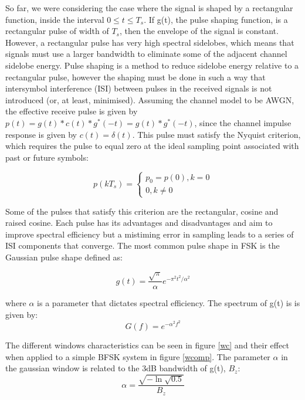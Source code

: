 \documentclass[12pt,a4paper,openright]{article}
\begin{document}
So far, we were considering the case where the signal is shaped by a rectangular function, inside the interval $0\leq t \leq T_s$. If g(t), the pulse shaping function, is a rectangular pulse of width of $T_s$, then the envelope of the signal is constant. However, a rectangular pulse has very high spectral sidelobes, which means that signals must use a larger bandwidth to eliminate some of the adjacent channel sidelobe energy. Pulse shaping is a method to reduce sidelobe energy relative to a rectangular pulse, however the shaping must be done in such a way that intersymbol interference (ISI) between pulses in the received signals is not introduced (or, at least, minimised). Assuming the channel model to be AWGN, the effective receive pulse is given by $p(t)=g(t) \ast c(t) \ast g^{*}(-t)=g(t) \ast g^{*}(-t)$, since the channel impulse response is given by $c(t)=\delta(t)$. This pulse must satisfy the Nyquist criterion, which requires the pulse to equal zero at the ideal sampling point associated with past or future symbols: 

 \[p(k{T_s}) = \left\{ \begin{array}{l}
{p_0} = p(0),k = 0\\
0,k \ne 0
\end{array} \right.\]

Some of the pulses that satisfy this criterion are the rectangular, cosine and raised cosine. Each pulse has its advantages and disadvantages and aim to improve spectral efficiency but a mistiming error in sampling leads to a series of ISI components that converge. The most common pulse shape in FSK is the Gaussian pulse shape defined as: 

\[g(t) = \frac{{\sqrt \pi  }}{\alpha }{e^{ - {\pi ^2}{t^2}/{\alpha ^2}}}\]

where $\alpha$ is a parameter that dictates spectral efficiency. The spectrum of g(t) is is given by: 
\[G(f) = {e^{ - {\alpha ^2}{f^2}}}\]


The different windows characteristics can be seen in figure \ref{wc} and their effect when applied to a simple BFSK system in figure \ref{wcomp}. The parameter $\alpha$ in the gaussian window is related to the 3dB bandwidth of g(t), $B_z$:
\[\alpha  = \frac{{\sqrt { - \ln \sqrt {0.5} } }}{{{B_z}}}\]
\end{document}
